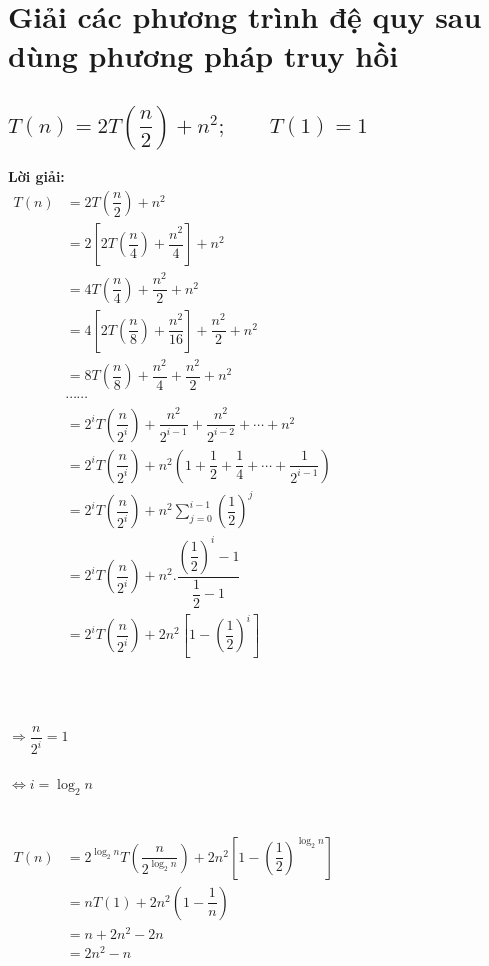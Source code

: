 \documentclass[12pt, letterpaper]{article}
\begin{document}
\section{Giải các phương trình đệ quy sau dùng phương pháp truy hồi}
\subsection{$T(n) = 2T(\dfrac{n}{2}) + n^2; \quad \quad T(1) = 1$}
\textbf{Lời giải:} \\
$ \begin{aligned}
    T(n) &= 2T(\dfrac{n}{2}) + n^2 \\
        &= 2[2T(\dfrac{n}{4}) + \dfrac{n^2}{4}] + n^2 \\
        &= 4T(\dfrac{n}{4}) + \dfrac{n^2}{2} + n^2 \\
        &= 4[2T(\dfrac{n}{8}) + \dfrac{n^2}{16}] + \dfrac{n^2}{2} + n^2 \\
        &= 8T(\dfrac{n}{8}) + \dfrac{n^2}{4} + \dfrac{n^2}{2} + n^2 \\
        &\cdots \cdots \\
        &= 2^iT(\dfrac{n}{2^i}) + \dfrac{n^2}{2^{i-1}} + \dfrac{n^2}{2^{i-2}} + \cdots + n^2 \\
        &= 2^iT(\dfrac{n}{2^i}) + n^2(1 + \dfrac{1}{2} + \dfrac{1}{4} + \cdots + \dfrac{1}{2^{i-1}}) \\
        &= 2^iT(\dfrac{n}{2^i}) + n^2 \sum_{j=0}^{i-1} (\dfrac{1}{2})^j \\
        &= 2^iT(\dfrac{n}{2^i}) + n^2 . \dfrac{(\dfrac{1}{2})^i - 1}{\dfrac{1}{2} - 1} \\
        &= 2^iT(\dfrac{n}{2^i}) + 2n^2 [1 - (\dfrac{1}{2})^i] \\
\end{aligned} $ \\ \\ \\
 \\
$\Rightarrow \dfrac{n}{2^i} = 1$ \\ \\
$\Leftrightarrow i = \log_2{n}$ \\ \\
 \\
$ \begin{aligned}
    T(n) &= 2^{\log_2{n}}T(\dfrac{n}{2^{\log_2{n}}}) + 2n^2[1 - (\dfrac{1}{2})^{\log_2{n}}] \\
        &= nT(1) + 2n^2(1 - \dfrac{1}{n}) \\
        &= n + 2n^2 - 2n \\
        &= 2n^2 - n
\end{aligned} $\\
\end{document}
